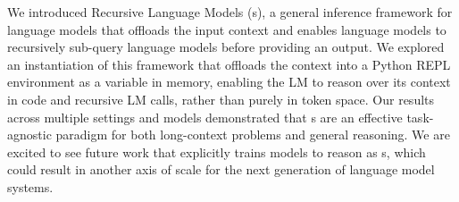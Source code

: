 We introduced Recursive Language Models (\RLM{}s), a general inference framework for language models that offloads the input context and enables language models to recursively sub-query language models before providing an output. We explored an instantiation of this framework that offloads the context into a Python REPL environment as a variable in memory, enabling the LM to reason over its context in code and recursive LM calls, rather than purely in token space. Our results across multiple settings and models demonstrated that \RLM{}s are an effective task-agnostic paradigm for both long-context problems and general reasoning. We are excited to see future work that explicitly trains models to reason as \RLM{}s, which could result in another axis of scale for the next generation of language model systems.
